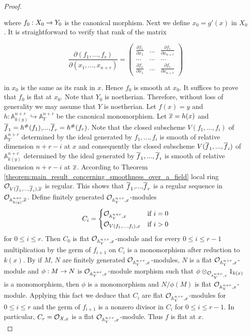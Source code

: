 \begin{proof}
\begin{center}
\end{center}
where $f_0:X_0\rightarrow Y_0$ is the canonical morphism. Next we define $x_0 = g'(x)$ in $X_0$. It is straightforward to verify that rank of the matrix
\begin{center}
\[ \frac{\partial(f_1,...,f_r)}{\partial(x_1,...,x_{n+r})}= \left( \begin{array}{ccc}
\frac{\partial f_1}{\partial x_1} & ... & \frac{\partial f_1}{\partial x_{n+r}} \\
... &...  &...  \\
\frac{\partial f_r}{\partial x_{1}} &...  & \frac{\partial f_r}{\partial x_{n+r}}\end{array} \right)\]
\end{center}
in $x_0$ is the same as its rank in $x$. Hence $f_0$ is smooth at $x_0$. It suffices to prove that $f_0$ is flat at $x_0$. Note that $Y_0$ is noetherian. Therefore, without loss of generality we may assume that $Y$ is noetherian. Let $f(x) = y$ and $h:\mathbb{A}^{n+r}_{k(y)} \hookrightarrow \mathbb{A}^{n+r}_Y$ be the canonical monomorphism. Let $\overline{x} = h(x)$ and $\overline{f}_1=h^{\#}(f_1)$,...,$\overline{f}_r=h^{\#}(f_r)$. Note that the closed subscheme $V(f_1,...,f_i)$ of $\mathbb{A}^{n+r}_Y$ determined by the ideal generated by $f_1,...,f_i$ is smooth of relative dimension $n+r-i$ at $x$ and consequently the closed subscheme $V(\overline{f}_1,...,\overline{f}_i)$ of $\mathbb{A}^{n+r}_{k(y)}$ determined by the ideal generated by $\overline{f}_1,...,\overline{f}_i$ is smooth of relative dimension $n+r-i$ at $\overline{x}$. According to Theorem \ref{theorem:main_result_concerning_smoothness_over_a_field} local ring ${\mathcal O}_{V(\overline{f}_1,...,\overline{f}_i),\overline{x}}$ is regular. This shows that $\overline{f}_1$,...,$\overline{f}_r$ is a regular sequence in ${\mathcal O}_{\mathbb{A}^{n+r}_{k(y)},\overline{x}}$. Define finitely generated ${\mathcal O}_{\mathbb{A}^{n+r}_{Y},x}$-modules
$$C_i=\begin{cases} 
{\mathcal O}_{\mathbb{A}^{n+r}_{Y},x} &\mbox{if } i=0\\
{\mathcal O}_{V(f_1,...,f_i),x} &\mbox{if } i>0
\end{cases}$$
for $0\leq i\leq r$. Then $C_0$ is flat ${\mathcal O}_{\mathbb{A}^{n+r}_{Y},x}$-module and for every $0\leq i\leq r-1$ multiplication by the germ of $f_{i+1}$ on $C_i$ is a monomorphism after reduction to $k(x)$. By {\cite[Corollary 3.5]{Flatnessingeometry}} if $M$, $N$ are finitely generated ${\mathcal O}_{\mathbb{A}^{n+r}_{Y},x}$-modules, $N$ is a flat ${\mathcal O}_{\mathbb{A}^{n+r}_{Y},x}$-module and $\phi:M\rightarrow N$ is ${\mathcal O}_{\mathbb{A}^{n+r}_{Y},x}$-module morphism such that $\phi\otimes_{{\mathcal O}_{\mathbb{A}^{n+r}_{Y},x}}1_{k(x)}$ is a monomorphism, then $\phi$ is a monomorphism and $N/\phi(M)$ is flat ${\mathcal O}_{\mathbb{A}^{n+r}_{Y},x}$-module. Applying this fact we deduce that $C_i$ are flat ${\mathcal O}_{\mathbb{A}^{n+r}_{Y},x}$-modules for $0\leq i\leq r$ and the germ of $f_{i+1}$ is a nonzero divisor in $C_i$ for $0\leq i\leq r-1$. In particular, $C_r = {\mathcal O}_{X,x}$ is a flat ${\mathcal O}_{\mathbb{A}^{n+r}_{Y},x}$-module. Thus $f$ is flat at $x$. \\

\end{proof}
